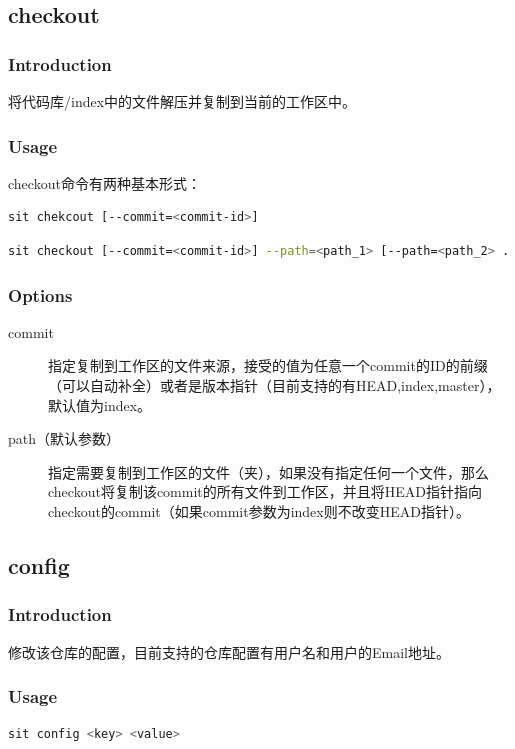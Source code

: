 \documentclass[11pt, a4paper, UTF8]{ctexart}
\begin{document}
\subsection{checkout}
\subsubsection{Introduction}
将代码库/index中的文件解压并复制到当前的工作区中。
\subsubsection{Usage}
checkout命令有两种基本形式：
\begin{lstlisting}[language=sh,basicstyle=\small\YaHeiMono,numbers=none]
sit chekcout [--commit=<commit-id>]
\end{lstlisting}
\begin{lstlisting}[language=sh,basicstyle=\small\YaHeiMono,numbers=none]
sit checkout [--commit=<commit-id>] --path=<path_1> [--path=<path_2> ...]
\end{lstlisting}
\subsubsection{Options}
\begin{description}
	\item[\YaHeiMono commit] 指定复制到工作区的文件来源，接受的值为任意一个commit的ID的前缀（可以自动补全）或者是版本指针（目前支持的有HEAD,index,master），默认值为index。
	\item[\YaHeiMono path（默认参数）] 指定需要复制到工作区的文件（夹），如果没有指定任何一个文件，那么checkout将复制该commit的所有文件到工作区，并且将HEAD指针指向checkout的commit（如果commit参数为index则不改变HEAD指针）。
\end{description}

\subsection{config}
\subsubsection{Introduction}
修改该仓库的配置，目前支持的仓库配置有用户名和用户的Email地址。
\subsubsection{Usage}
\begin{lstlisting}[language=sh,basicstyle=\small\YaHeiMono,numbers=none]
sit config <key> <value>
\end{lstlisting}
\end{document}
